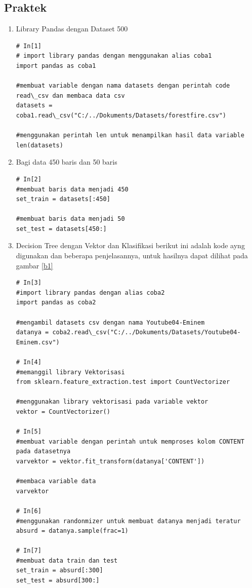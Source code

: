 \subsection{Praktek}
\begin{enumerate}
\item Library Pandas dengan Dataset 500
\begin{verbatim}
# In[1] 
# import library pandas dengan menggunakan alias coba1
import pandas as coba1 

#membuat variable dengan nama datasets dengan perintah code read\_csv dan membaca data csv
datasets = coba1.read\_csv("C:/../Dokuments/Datasets/forestfire.csv")

#menggunakan perintah len untuk menampilkan hasil data variable
len(datasets)
\end{verbatim}

\item Bagi data 450 baris dan 50 baris
\begin{verbatim}
# In[2]
#membuat baris data menjadi 450
set_train = datasets[:450]

#membuat baris data menjadi 50
set_test = datasets[450:]
\end{verbatim}

\item Decision Tree dengan Vektor dan Klasifikasi
\subitem berikut ini adalah kode ayng digunakan dan beberapa penjelasannya, untuk hasilnya dapat dilihat pada gambar \ref{b1}
\begin{verbatim}
# In[3]
#import library pandas dengan alias coba2
import pandas as coba2

#mengambil datasets csv dengan nama Youtube04-Eminem
datanya = coba2.read\_csv("C:/../Dokuments/Datasets/Youtube04-Eminem.csv")

# In[4]
#memanggil library Vektorisasi
from sklearn.feature_extraction.test import CountVectorizer

#menggunakan library vektorisasi pada variable vektor
vektor = CountVectorizer()

# In[5]
#membuat variable dengan perintah untuk memproses kolom CONTENT pada datasetnya
varvektor = vektor.fit_transform(datanya['CONTENT'])

#membaca variable data
varvektor

# In[6]
#menggunakan randonmizer untuk membuat datanya menjadi teratur
absurd = datanya.sample(frac=1)

# In[7]
#membuat data train dan test
set_train = absurd[:300]
set_test = absurd[300:]


\end{verbatim}
\end{enumerate}
